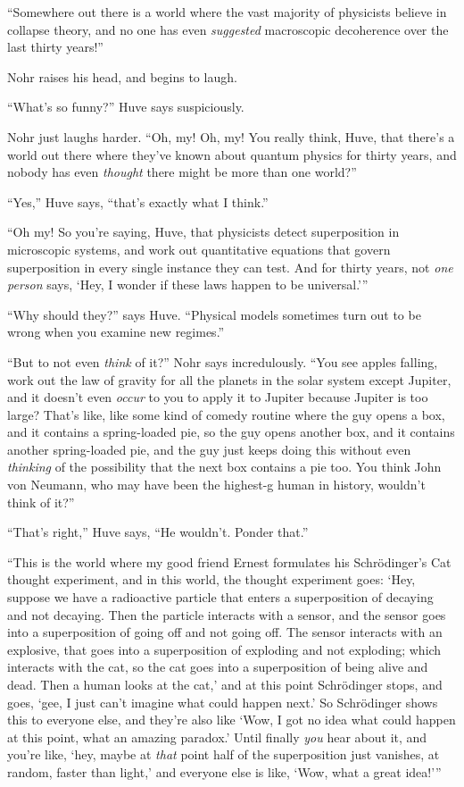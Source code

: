 {
 ``Somewhere out there is a world where the vast
majority of physicists believe in collapse theory, and no one has even
\textit{suggested} macroscopic decoherence over the last thirty
years!''}

{
 Nohr raises his head, and begins to laugh.}

{
 ``What's so
funny?'' Huve says suspiciously.}

{
 Nohr just laughs harder. ``Oh, my! Oh, my! You
really think, Huve, that there's a world out there
where they've known about quantum physics for thirty
years, and nobody has even \textit{thought} there might be more than
one world?''}

{
 ``Yes,'' Huve says,
``that's exactly what I
think.''}

{
 ``Oh my! So you're saying, Huve,
that physicists detect superposition in microscopic systems, and work
out quantitative equations that govern superposition in every single
instance they can test. And for thirty years, not \textit{one person}
says, `Hey, I wonder if these laws happen to be
universal.'''}

{
 ``Why should they?'' says Huve.
``Physical models sometimes turn out to be wrong when
you examine new regimes.''}

{
 ``But to not even \textit{think} of
it?'' Nohr says incredulously. ``You
see apples falling, work out the law of gravity for all the planets in
the solar system except Jupiter, and it doesn't even
\textit{occur} to you to apply it to Jupiter because Jupiter is too
large? That's like, like some kind of comedy routine
where the guy opens a box, and it contains a spring-loaded pie, so the
guy opens another box, and it contains another spring-loaded pie, and
the guy just keeps doing this without even \textit{thinking} of the
possibility that the next box contains a pie too. You think John von
Neumann, who may have been the highest-g human in history,
wouldn't think of it?''}

{
 ``That's
right,'' Huve says, ``He
wouldn't. Ponder that.''}

{
 ``This is the world where my good friend Ernest
formulates his Schrödinger's Cat thought experiment,
and in this world, the thought experiment goes: `Hey,
suppose we have a radioactive particle that enters a superposition of
decaying and not decaying. Then the particle interacts with a sensor,
and the sensor goes into a superposition of going off and not going
off. The sensor interacts with an explosive, that goes into a
superposition of exploding and not exploding; which interacts with the
cat, so the cat goes into a superposition of being alive and dead. Then
a human looks at the cat,' and at this point
Schrödinger stops, and goes, `gee, I just
can't imagine what could happen next.'
So Schrödinger shows this to everyone else, and they're
also like `Wow, I got no idea what could happen at this
point, what an amazing paradox.' Until finally
\textit{you} hear about it, and you're like,
`hey, maybe at \textit{that} point half of the
superposition just vanishes, at random, faster than
light,' and everyone else is like, `Wow,
what a great idea!'''}


